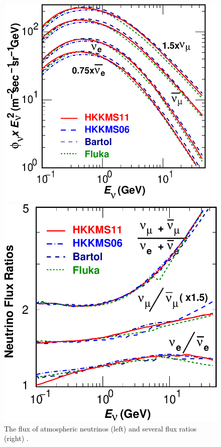 \begin{figure}[htbp]
\begin{minipage}[c]{.46\linewidth}
   	      \includegraphics[width=0.9\linewidth]{figures/fig7a-c.pdf}
   \end{minipage} \hfill
   \begin{minipage}{.46\linewidth}
      \includegraphics[width=0.9\linewidth]{figures/fig7b-c.pdf}
   \end{minipage}
    \caption{The flux of atmospheric neutrinos (left) and several flux ratios (right) \cite{PhysRevD.83.123001}. }
 \label{fig:nuatmflux}
\end{figure}



